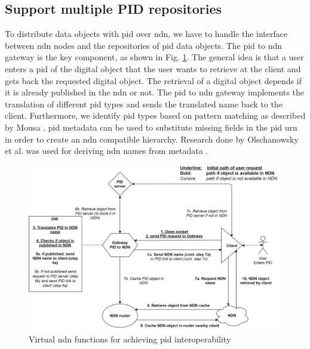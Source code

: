 \documentclass[conference]{IEEEtran}
\begin{document}
\subsection{Support multiple PID repositories}
\label{multiple-pid-repos}
To distribute data objects with \gls{pid} over \gls{ndn}, we have to handle the interface between \gls{ndn} nodes and the repositories of \gls{pid} data objects. The \gls{pid} to \gls{ndn} gateway is the key component, as shown in Fig. \ref{fig:sdc_model}. The general idea is that a user enters a \gls{pid} of the digital object that the user wants to retrieve at the client and gets back the requested digital object. The retrieval of a digital object depends if it is already published in the \gls{ndn} or not. The \gls{pid} to \gls{ndn} gateway implements the translation of different \gls{pid} types and sends the translated name back to the client. Furthermore, we identify \gls{pid} types based on pattern matching as described by Mousa \cite{ndn-app-aware}. \gls{pid} metadata can be used to substitute missing fields in the \gls{pid} \gls{urn} in order to create an \gls{ndn} compatible hierarchy. Research done by Olschanowsky et al. was used for deriving \gls{ndn} names from metadata \cite{ndn-man}.


\begin{figure}[H]
\centering
\includegraphics[width=\columnwidth]{images/PIDtoNDN.png}
\caption{Virtual \gls{ndn} functions for achieving \gls{pid} interoperability}
\label{fig:sdc_model}
\end{figure}
\end{document}
